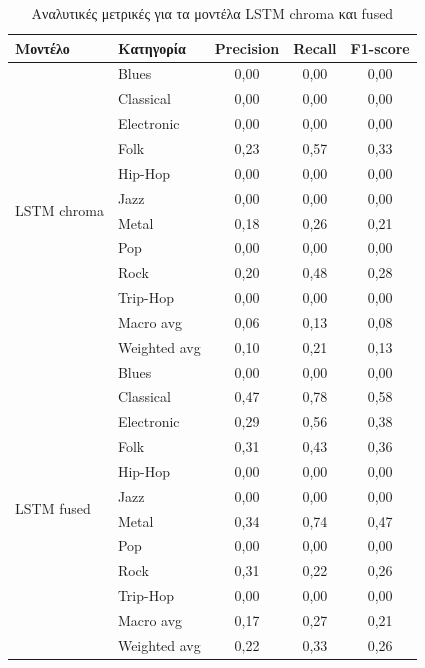 \documentclass[a4paper,12pt]{article}
\begin{document}
\begin{table}[H]
    \centering
    \tiny
    \begin{tabular}{@{}llccc@{}}
        \toprule
        \textbf{Μοντέλο} & \textbf{Κατηγορία} & \textbf{Precision} & \textbf{Recall} & \textbf{F1-score} \\
        \midrule
        \multirow{12}{*}{LSTM chroma}
        & Blues & 0,00 & 0,00 & 0,00 \\
        & Classical & 0,00 & 0,00 & 0,00 \\
        & Electronic & 0,00 & 0,00 & 0,00 \\
        & Folk & 0,23 & 0,57 & 0,33 \\
        & Hip-Hop & 0,00 & 0,00 & 0,00 \\
        & Jazz & 0,00 & 0,00 & 0,00 \\
        & Metal & 0,18 & 0,26 & 0,21 \\
        & Pop & 0,00 & 0,00 & 0,00 \\
        & Rock & 0,20 & 0,48 & 0,28 \\
        & Trip-Hop & 0,00 & 0,00 & 0,00 \\
        \cmidrule{2-5}
        & Macro avg & 0,06 & 0,13 & 0,08 \\
        & Weighted avg & 0,10 & 0,21 & 0,13 \\
        \midrule
        \multirow{12}{*}{LSTM fused}
        & Blues & 0,00 & 0,00 & 0,00 \\
        & Classical & 0,47 & 0,78 & 0,58 \\
        & Electronic & 0,29 & 0,56 & 0,38 \\
        & Folk & 0,31 & 0,43 & 0,36 \\
        & Hip-Hop & 0,00 & 0,00 & 0,00 \\
        & Jazz & 0,00 & 0,00 & 0,00 \\
        & Metal & 0,34 & 0,74 & 0,47 \\
        & Pop & 0,00 & 0,00 & 0,00 \\
        & Rock & 0,31 & 0,22 & 0,26 \\
        & Trip-Hop & 0,00 & 0,00 & 0,00 \\
        \cmidrule{2-5}
        & Macro avg & 0,17 & 0,27 & 0,21 \\
        & Weighted avg & 0,22 & 0,33 & 0,26 \\
        \bottomrule
    \end{tabular}
    \caption{Αναλυτικές μετρικές για τα μοντέλα LSTM chroma και fused}
\end{table}
\end{document}
